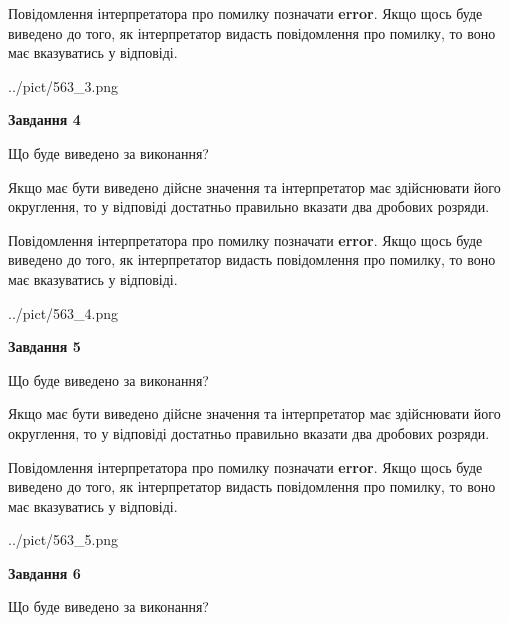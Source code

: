 \documentclass[12pt, ukrainian]{article}
\begin{document}
{\begin {Large}
Повідомлення інтерпретатора про помилку позначати \textbf{error}.
Якщо щось буде виведено до того, як інтерпретатор видасть повідомлення про помилку, 
то воно має вказуватись у відповіді. \par

\begin{center}
	{../pict/563_3.png}
\end{center}
\newpage

{\begin {center}\textbf{Завдання 4}\end {center}}\par
Що буде виведено за виконання? \par

Якщо має бути виведено дійсне значення та інтерпретатор має здійснювати його округлення, 
то у відповіді достатньо правильно вказати два дробових розряди.

Повідомлення інтерпретатора про помилку позначати \textbf{error}.
Якщо щось буде виведено до того, як інтерпретатор видасть повідомлення про помилку, 
то воно має вказуватись у відповіді. \par

\begin{center}
	{../pict/563_4.png}
\end{center}
\newpage

{\begin {center}\textbf{Завдання 5}\end {center}}\par
Що буде виведено за виконання? \par

Якщо має бути виведено дійсне значення та інтерпретатор має здійснювати його округлення, 
то у відповіді достатньо правильно вказати два дробових розряди.

Повідомлення інтерпретатора про помилку позначати \textbf{error}.
Якщо щось буде виведено до того, як інтерпретатор видасть повідомлення про помилку, 
то воно має вказуватись у відповіді. \par

\begin{center}
	{../pict/563_5.png}
\end{center}
\newpage

{\begin {center}\textbf{Завдання 6}\end {center}}\par
Що буде виведено за виконання? \par


\end{Large}}
\end{document}
